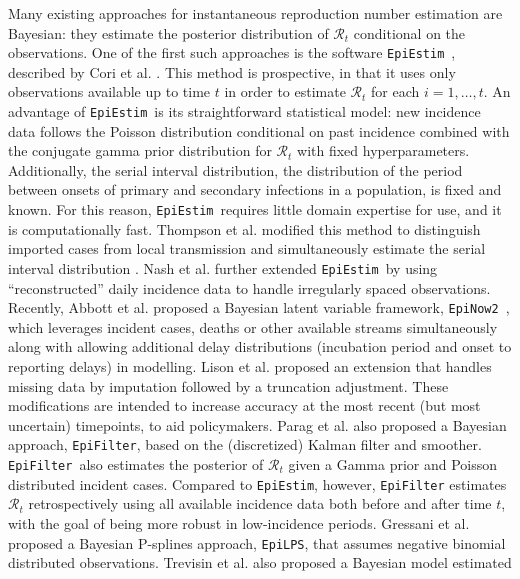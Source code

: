\documentclass[10pt,letterpaper]{article}
\def\EpiEstim{\texttt{EpiEstim}}
\def\EpiLPS{\texttt{EpiLPS}}
\def\EpiFilter{\texttt{EpiFilter}}
\def\EpiNow2{\texttt{EpiNow2}}
\def\calR{\mathcal{R}}
\begin{document}
Many existing approaches for instantaneous reproduction number estimation are
Bayesian: they estimate the posterior distribution of $\calR_t$ conditional on
the observations. One of the first such approaches is the software \EpiEstim\
\cite{cori2020package}, described by Cori et al. \cite{cori2013new}. This method is
prospective, in that it uses only observations available up to time $t$ in order
to estimate $\calR_t$ for each $i = 1,\ldots, t$. An advantage of \EpiEstim\ is
its straightforward statistical model: new incidence data follows the Poisson
distribution conditional on past incidence combined with the conjugate gamma
prior distribution for $\calR_t$ with fixed hyperparameters. Additionally, the
serial interval distribution, the distribution of the period between onsets of
primary and secondary infections in a population, is fixed and known. For this
reason, \EpiEstim\ requires little domain expertise for use, and it is
computationally fast. Thompson et al. \cite{thompson2019improved} modified this method to
distinguish imported cases from local transmission and simultaneously estimate
the serial interval distribution . Nash et al. \cite{nash2023estimating} further extended
\EpiEstim\ by using ``reconstructed'' daily incidence data to handle irregularly
spaced observations. Recently, Abbott et al. \cite{abbott2020estimating} proposed a Bayesian
latent variable framework, \EpiNow2\ \cite{EpiNow2}, which leverages
incident cases, deaths or other available streams simultaneously along with
allowing additional delay distributions (incubation period and onset to
reporting delays) in modelling. Lison et al. \cite{lison2024generative} proposed 
an extension that handles missing data by imputation followed by a truncation adjustment. 
These modifications are intended
to increase accuracy at the most recent (but most uncertain) timepoints, to aid 
policymakers. Parag et al. \cite{parag2021improved} also proposed a Bayesian approach, 
\EpiFilter, based on the (discretized) Kalman filter and smoother. 
\EpiFilter\ also estimates the posterior of $\calR_t$ given a Gamma 
prior and Poisson distributed incident cases. Compared to \EpiEstim, 
however, \texttt{EpiFilter} estimates $\calR_t$ retrospectively using all 
available incidence data both before and after time $t$, with the goal of being 
more robust in low-incidence periods. Gressani et al. \cite{gressani2022epilps} proposed a 
Bayesian P-splines approach, \EpiLPS, that assumes negative binomial distributed 
observations. Trevisin et al. \cite{trevisin2023spatially} also proposed a Bayesian model estimated 
\end{document}
